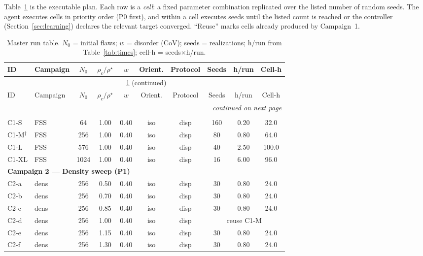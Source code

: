 \documentclass[11pt]{article}
\newcommand{\rhoc}{\rho_c}
\newcommand{\rhostar}{\rho^{\star}}
\begin{document}
Table~\ref{tab:runs} is the executable plan. Each row is a \emph{cell}: a fixed
parameter combination replicated over the listed number of random seeds. The agent
executes cells in priority order (P0 first), and within a cell executes seeds until the
listed count is reached or the controller (Section~\ref{sec:learning}) declares the
relevant target converged. ``Reuse'' marks cells already produced by Campaign~1.

\begin{longtable}{l l c c c c c c c c}
\caption{Master run table. $N_0$ = initial flaws; $w$ = disorder (CoV); seeds =
realizations; h/run from Table~\ref{tab:times}; cell-h = seeds$\times$h/run.}
\label{tab:runs}\\
\toprule
ID & Campaign & $N_0$ & $\rhoc/\rhostar$ & $w$ & Orient. & Protocol & Seeds & h/run & Cell-h \\
\midrule
\endfirsthead
\multicolumn{10}{c}{\tablename~\ref{tab:runs} (continued)}\\
\toprule
ID & Campaign & $N_0$ & $\rhoc/\rhostar$ & $w$ & Orient. & Protocol & Seeds & h/run & Cell-h \\
\midrule
\endhead
\midrule
\multicolumn{10}{r}{\emph{continued on next page}}\\
\endfoot
\bottomrule
\endlastfoot
\multicolumn{10}{l}{\textbf{Campaign 1 --- Finite-size scaling (P0, primary)}}\\
C1-S  & FSS & 64   & 1.00 & 0.40 & iso & disp & 160 & 0.20 & 32.0 \\
C1-M$^\dagger$ & FSS & 256  & 1.00 & 0.40 & iso & disp & 80  & 0.80 & 64.0 \\
C1-L  & FSS & 576  & 1.00 & 0.40 & iso & disp & 40  & 2.50 & 100.0 \\
C1-XL & FSS & 1024 & 1.00 & 0.40 & iso & disp & 16  & 6.00 & 96.0 \\[2pt]
\multicolumn{10}{l}{\textbf{Campaign 2 --- Density sweep (P1)}}\\
C2-a & dens & 256 & 0.50 & 0.40 & iso & disp & 30 & 0.80 & 24.0 \\
C2-b & dens & 256 & 0.70 & 0.40 & iso & disp & 30 & 0.80 & 24.0 \\
C2-c & dens & 256 & 0.85 & 0.40 & iso & disp & 30 & 0.80 & 24.0 \\
C2-d & dens & 256 & 1.00 & 0.40 & iso & disp & \multicolumn{3}{c}{reuse C1-M} \\
C2-e & dens & 256 & 1.15 & 0.40 & iso & disp & 30 & 0.80 & 24.0 \\
C2-f & dens & 256 & 1.30 & 0.40 & iso & disp & 30 & 0.80 & 24.0 \\

\end{longtable}
\end{document}
